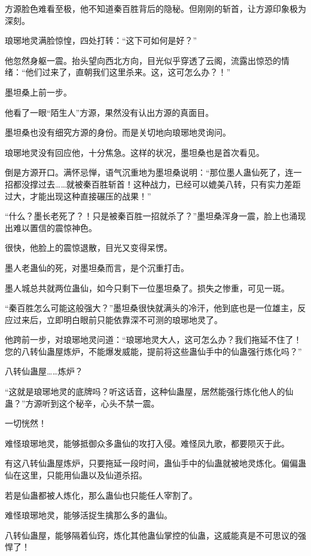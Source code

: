 \begin{this_body}
方源脸色难看至极，他不知道秦百胜背后的隐秘。但刚刚的斩首，让方源印象极为深刻。

琅琊地灵满脸惊惶，四处打转：“这下可如何是好？”

他忽然身躯一震。抬头望向西北方向，目光似乎穿透了云阁，流露出惊恐的情绪：“他们过来了，直朝我们这里杀来。这，这可怎么办？！”

墨坦桑上前一步。

他看了一眼“陌生人”方源，果然没有认出方源的真面目。

墨坦桑也没有细究方源的身份。而是关切地向琅琊地灵询问。

琅琊地灵没有回应他，十分焦急。这样的状况，墨坦桑也是首次看见。

倒是方源开口。满怀忌惮，语气沉重地为墨坦桑说明：“那位墨人蛊仙死了，连一招都没撑过去……就被秦百胜斩首！这种战力，已经可以媲美八转，只有实力差距过大，才能出现这种直接碾压的战果！”

“什么？墨长老死了？！只是被秦百胜一招就杀了？”墨坦桑浑身一震，脸上也涌现出难以置信的震惊神色。

很快，他脸上的震惊退散，目光又变得呆愣。

墨人老蛊仙的死，对墨坦桑而言，是个沉重打击。

墨人城总共就两位蛊仙，如今只剩下一位墨坦桑了。损失之惨重，可见一斑。

“秦百胜怎么可能这般强大？”墨坦桑很快就满头的冷汗，他到底也是一位雄主，反应过来后，立即明白眼前只能依靠深不可测的琅琊地灵了。

他跨前一步，对琅琊地灵问道：“琅琊地灵大人，这可怎么办？我们拖延不住了！您的八转仙蛊屋炼炉，不能爆发威能，提前将这些蛊仙手中的仙蛊强行炼化吗？”

八转仙蛊屋……炼炉？

“这就是琅琊地灵的底牌吗？听这话音，这种仙蛊屋，居然能强行炼化他人的仙蛊？”方源听到这个秘辛，心头不禁一震。

一切恍然！

难怪琅琊地灵，能够抵御众多蛊仙的攻打入侵。难怪凤九歌，都要陨灭于此。

有这八转仙蛊屋炼炉，只要拖延一段时间，蛊仙手中的仙蛊就被地灵炼化。偏偏蛊仙在这里，只能用仙蛊以及仙道杀招。

若是仙蛊都被人炼化，那么蛊仙也只能任人宰割了。

难怪琅琊地灵，能够活捉生擒那么多的蛊仙。

八转仙蛊屋，能够隔着仙窍，炼化其他蛊仙掌控的仙蛊，这威能真是不可思议的强悍了！


\end{this_body}
